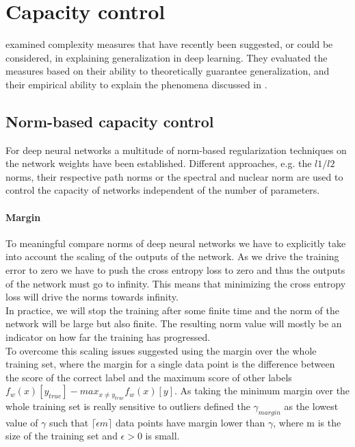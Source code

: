 
\section{Capacity control}
\ns{} examined complexity measures that have recently been suggested, or could be considered, in explaining generalization in deep learning. They evaluated the measures based on their ability to theoretically guarantee generalization, and their empirical ability to explain the phenomena discussed in . 
%
\subsection{Norm-based capacity control}
For deep neural networks a multitude of norm-based regularization techniques on the network weights have been established. Different approaches, e.g. the $l1/l2$ norms, their respective path norms \cite{DBLP:journals/corr/NeyshaburSS15} or the spectral and nuclear norm are used to control the capacity of networks independent of the number of parameters.
%
\paragraph{Margin}
To meaningful compare norms of deep neural networks we have to explicitly take into account the scaling of the outputs of the network. As we drive the training error to zero we have to push the cross entropy loss to zero and thus the outputs of the network must go to infinity. This means that minimizing the cross entropy loss will drive the norms towards infinity. \\
In practice, we will stop the training after some finite time and the norm of the network will be large but also finite. The resulting norm value will mostly be an indicator on how far the training has progressed.\\
To overcome this scaling issues \cite{neyshabur2017exploring} suggested using the margin over the whole training set, where the margin for a single data point is the difference between the score of the correct label and the maximum score of other labels $f_w(x)[y_{true}] - max_{x \neq y_{true}}f_w(x)[y]$. As taking the minimum margin over the whole training set is really sensitive to outliers \cite{neyshabur2017exploring} defined the $\gamma_{margin}$ as the lowest value of $\gamma$ such that $\lceil\epsilon m\rceil$ data points have margin lower than $\gamma$, where m is the size of the training set and $\epsilon > 0$ is small.
%
